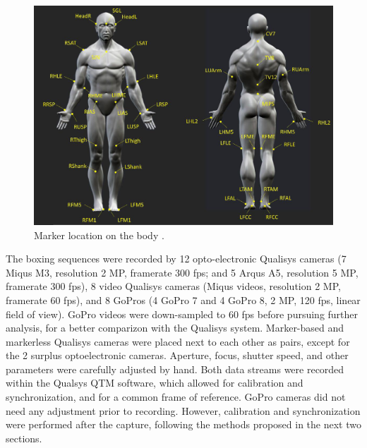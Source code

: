 \begin{figure}[!ht]
	\centering
	\def\svgwidth{1\columnwidth} 
	\fontsize{10pt}{10pt}\selectfont
	\includegraphics[width=\linewidth]{"../Chap6/Figures/Fig_MkBoxe.PNG"}
	\caption{Marker location on the body \cite{Lahkar2022b}.}
	\label{fig_mkboxe}
\end{figure}

The boxing sequences were recorded by 12 opto-electronic Qualisys cameras (7 Miqus M3, resolution 2 MP, framerate 300 fps; and 5 Arqus A5, resolution 5 MP, framerate 300 fps), 8 video Qualisys cameras (Miqus videos, resolution 2 MP, framerate 60 fps), and 8 GoPros (4 GoPro 7 and 4 GoPro 8, 2 MP, 120 fps, linear field of view). GoPro videos were down-sampled to 60 fps before pursuing further analysis, for a better comparizon with the Qualisys system. Marker-based and markerless Qualisys cameras were placed next to each other as pairs, except for the 2 surplus optoelectronic cameras. Aperture, focus, shutter speed, and other parameters were carefully adjusted by hand. Both data streams were recorded within the Qualsys QTM software, which allowed for calibration and synchronization, and for a common frame of reference. GoPro cameras did not need any adjustment prior to recording. However, calibration and synchronization were performed after the capture, following the methods proposed in the next two sections. 

